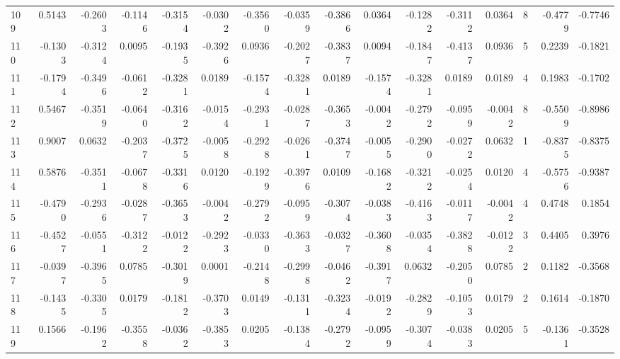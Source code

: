 \begin{tabular}{lrrrrrrrrrrrrrrr}
109 &      0.5143 & -0.2603 & -0.1146 & -0.3154 & -0.0302 & -0.3560 & -0.0359 & -0.3866 &  0.0364 & -0.1282 &  -0.3112 &     0.0364 &      8 &                   -0.4779 &                    -0.7746 \\
110 &     -0.1303 & -0.3124 &  0.0095 & -0.1935 & -0.3926 &  0.0936 & -0.2027 & -0.3837 &  0.0094 & -0.1847 &  -0.4137 &     0.0936 &      5 &                    0.2239 &                    -0.1821 \\
111 &     -0.1794 & -0.3496 & -0.0612 & -0.3281 &  0.0189 & -0.1574 & -0.3281 &  0.0189 & -0.1574 & -0.3281 &   0.0189 &     0.0189 &      4 &                    0.1983 &                    -0.1702 \\
112 &      0.5467 & -0.3519 & -0.0640 & -0.3162 & -0.0154 & -0.2931 & -0.0287 & -0.3653 & -0.0042 & -0.2792 &  -0.0959 &    -0.0042 &      8 &                   -0.5509 &                    -0.8986 \\
113 &      0.9007 &  0.0632 & -0.2037 & -0.3725 & -0.0058 & -0.2928 & -0.0261 & -0.3747 & -0.0055 & -0.2900 &  -0.0272 &     0.0632 &      1 &                   -0.8375 &                    -0.8375 \\
114 &      0.5876 & -0.3511 & -0.0678 & -0.3316 &  0.0120 & -0.1929 & -0.3976 &  0.0109 & -0.1682 & -0.3212 &  -0.0254 &     0.0120 &      4 &                   -0.5756 &                    -0.9387 \\
115 &     -0.4790 & -0.2936 & -0.0287 & -0.3653 & -0.0042 & -0.2792 & -0.0959 & -0.3074 & -0.0383 & -0.4163 &  -0.0117 &    -0.0042 &      4 &                    0.4748 &                     0.1854 \\
116 &     -0.4527 & -0.0551 & -0.3122 & -0.0122 & -0.2923 & -0.0330 & -0.3633 & -0.0327 & -0.3608 & -0.0354 &  -0.3828 &    -0.0122 &      3 &                    0.4405 &                     0.3976 \\
117 &     -0.0397 & -0.3965 &  0.0785 & -0.3019 &  0.0001 & -0.2148 & -0.2998 & -0.0462 & -0.3917 &  0.0632 &  -0.2050 &     0.0785 &      2 &                    0.1182 &                    -0.3568 \\
118 &     -0.1435 & -0.3305 &  0.0179 & -0.1812 & -0.3703 &  0.0149 & -0.1311 & -0.3234 & -0.0192 & -0.2829 &  -0.1053 &     0.0179 &      2 &                    0.1614 &                    -0.1870 \\
119 &      0.1566 & -0.1962 & -0.3558 & -0.0362 & -0.3853 &  0.0205 & -0.1384 & -0.2792 & -0.0959 & -0.3074 &  -0.0383 &     0.0205 &      5 &                   -0.1361 &                    -0.3528 \\

\end{tabular}
